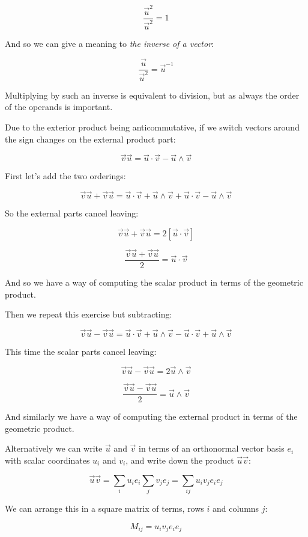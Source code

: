 $$\frac{ \vec{u}^2 }{ \vec{u}^2 } = 1$$

And so we can give a meaning to \textit{the inverse of a vector}:

$$\frac{ \vec{u} }{ \vec{u}^2 } = \vec{u}^{-1}$$

Multiplying by such an inverse is equivalent to division, but as always the order of the operands is important.

Due to the exterior product being anticommutative, if we switch vectors around the sign changes on the external product part:

$$
\vec{v}\vec{u}
= \vec{u} \cdot \vec{v} - \vec{u} \wedge \vec{v}
$$

First let's add the two orderings:

$$
\vec{v}\vec{u} + \vec{v}\vec{u}
= \vec{u} \cdot \vec{v} + \vec{u} \wedge \vec{v} + \vec{u} \cdot \vec{v} - \vec{u} \wedge \vec{v}
$$

So the external parts cancel leaving:

$$
\vec{v}\vec{u} + \vec{v}\vec{u}
= 2 \left[ \vec{u} \cdot \vec{v} \right]
$$

$$
\frac{\vec{v}\vec{u} + \vec{v}\vec{u}} {2}
= \vec{u} \cdot \vec{v}
$$

And so we have a way of computing the scalar product in terms of the geometric product.

Then we repeat this exercise but subtracting:

$$
\vec{v}\vec{u} - \vec{v}\vec{u}
= \vec{u} \cdot \vec{v} + \vec{u} \wedge \vec{v} - \vec{u} \cdot \vec{v} + \vec{u} \wedge \vec{v}
$$

This time the scalar parts cancel leaving:

$$
\vec{v}\vec{u} - \vec{v}\vec{u}
= 2\vec{u} \wedge \vec{v}
$$

$$
\frac{\vec{v}\vec{u} - \vec{v}\vec{u}} {2}
= \vec{u} \wedge \vec{v}
$$

And similarly we have a way of computing the external product in terms of the geometric product.

Alternatively we can write $\vec{u}$ and $\vec{v}$ in terms of an orthonormal vector basis $e_i$ with scalar coordinates $u_i$ and $v_i$, and write down the product $\vec{u}\vec{v}$:

$$
\vec{u}\vec{v} = \sum_i{u_i e_i} \sum_j{v_j e_j}
= \sum_{ij}{u_i v_j e_i e_j}
$$

We can arrange this in a square matrix of terms, rows $i$ and columns $j$:

$$
M_{ij} = {u_i v_j e_i e_j}
$$

